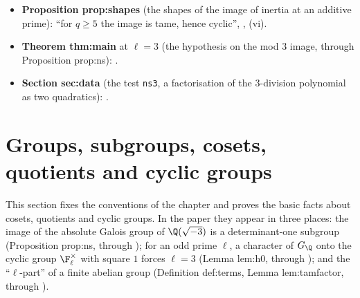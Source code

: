 \begin{itemize}
; for Lemma lem:tamagawa-exp ($\rho\bmod\ell^t$): .
\item \textbf{Proposition prop:shapes} (the shapes of the image of inertia at an additive prime): ``for $q\ge5$ the image is tame, hence cyclic'',
, (vi).
\item \textbf{Theorem thm:main} at $\ell=3$ (the hypothesis on the mod $3$ image, through Proposition prop:ns): .
\item \textbf{Section sec:data} (the test \texttt{ns3}, a factorisation of the $3$-division polynomial as two quadratics): .
\end{itemize}

\section{Groups, subgroups, cosets, quotients and cyclic groups}\label{sec:groups:basics}

This section fixes the conventions of the chapter and proves the basic facts about cosets, quotients
and cyclic groups. In the paper they appear in three places: the image of the absolute Galois group of
$\Q(\sqrt{-3})$ is a determinant-one subgroup (Proposition prop:ns, through ); for an odd prime $\ell$, a character
of $G_\Q$ onto the cyclic group $\F_\ell^\times$ with square $1$ forces $\ell=3$ (Lemma lem:h0, through
); and the ``$\ell$-part'' of a finite abelian group (Definition def:terms, Lemma lem:tamfactor,
through ).

